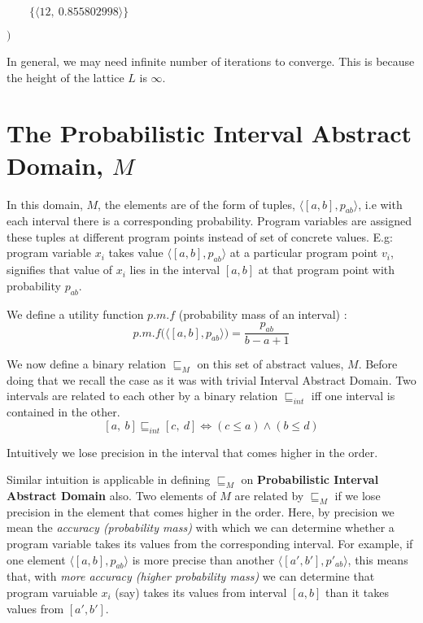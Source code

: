 \documentclass[final,3p, review, times]{util/elsarticle}
\begin{document}
$\qquad\Big\{\big\langle 12,\ 0.855802998\big\rangle\Big\}
$

$\bigg)$

In general, we may need infinite number of iterations to converge. This is because the height of the lattice $L$ is $\infty$.


\section{The Probabilistic Interval Abstract Domain, $M$}

In this domain, $M$, the elements are of the form of tuples, $\langle[a,b],p_{ab}\rangle$, i.e with each interval there is a corresponding probability. Program variables are assigned these tuples at different program points instead of set of concrete values. E.g: program variable $x_i$ takes value $\langle[a,b],p_{ab}\rangle$ at a particular program point $v_i$, signifies that value of $x_i$ lies in the interval $[a,b]$ at that program point with probability $p_{ab}$.

We define a utility function \underline{$\mathit{p.m.f}$} (probability mass of an interval) :
\begin{equation}
\label{eq:pmf}
p.m.f\Big(\langle[a,b],p_{ab}\rangle\Big)=\frac{p_{ab}}{b-a+1}
\end{equation}

We now define a binary relation $\sqsubseteq_M$ on this set of abstract values, $M$. Before doing that we recall the case as it was with trivial Interval Abstract Domain\cite{nielson99}. Two intervals are related to each other by a binary relation $\sqsubseteq_{int}$ iff one interval is contained in the other.
\begin{equation}\label{eq:interval_def}
[a,\ b]\sqsubseteq_{int}[c,\ d]\iff (c\leq a)\land (b\leq d)
\end{equation}

Intuitively we lose precision in the interval that comes higher in the order.

Similar intuition is applicable in defining $\sqsubseteq_M$ on \textbf{Probabilistic Interval Abstract Domain} also. Two elements of $M$ are related by $\sqsubseteq_M$ if we lose precision in the element that comes higher in the order. Here, by precision we mean the \textit{accuracy (probability mass)} with which we can determine whether a program variable takes its values from the corresponding interval. For example, if one element $\langle[a,b],p_{ab}\rangle$ is more precise than another $\langle[a',b'],p'_{ab}\rangle$, this means that, with \textit{more accuracy (higher probability mass)} we can determine that program varuiable $x_i$ (say) takes its values from interval $[a,b]$ than it takes values from $[a',b']$.
\end{document}
